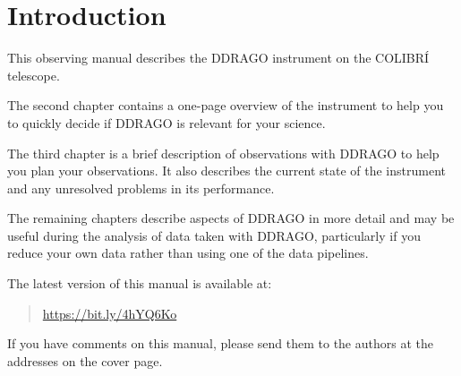 \chapter{Introduction}

This observing manual describes the DDRAGO instrument on the COLIBRÍ telescope. 

The second chapter contains a one-page overview of the instrument to help you to quickly decide if DDRAGO is relevant for your science. 

The third chapter is a brief description of observations with DDRAGO to help you plan your observations. It also describes the current state of the instrument and any unresolved problems in its performance.

The remaining chapters describe aspects of DDRAGO in more detail and may be useful during the analysis of data taken with DDRAGO, particularly if you reduce your own data rather than using one of the data pipelines.

The latest version of this manual is available at:

\begin{quote}
\url{https://bit.ly/4hYQ6Ko}
\end{quote}

If you have comments on this manual, please send them to the authors at the addresses on the cover page.
